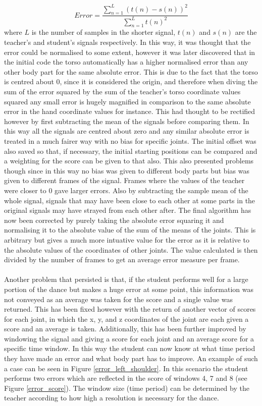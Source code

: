 \documentclass[a4paper]{article}
\begin{document}
\begin{equation}
Error = \dfrac{\sum\limits_{n=1}^{L}(t(n)-s(n))^2}{\sum\limits_{n=1}^{L}t(n)^2}
\end{equation}
where $L$ is the number of samples in the shorter signal, $t(n)$ and $s(n)$ are the teacher's and student's signals respectively. In this way, it was thought that the error could be normalised to some extent, however it was later discovered that in the initial code the torso automatically has a higher normalised error than any other body part for the same absolute error. This is due to the fact that the torso is centred about 0, since it is considered the origin, and therefore when diving the sum of the error squared by the sum of the teacher's torso coordinate values squared any small error is hugely magnified in comparison to the same absolute error in the hand coordinate values for instance. This had thought to be rectified however by first subtracting the mean of the signals before comparing them. In this way all the signals are centred about zero and any similar absolute error is treated in a much fairer way with no bias for specific joints. The initial offset was also saved so that, if necessary, the initial starting positions can be compared and a weighting for the score can be given to that also. This also presented problems though since in this way no bias was given to different body parts but bias was given to different frames of the signal. Frames where the values of the teacher were closer to 0 gave larger errors. Also by subtracting the sample mean of the whole signal, signals that may have been close to each other at some parts in the original signals may have strayed from each other after. The final algorithm has now been corrected by purely taking the absolute error squaring it and normalising it to the absolute value of the sum of the means of the joints. This is arbitrary but gives a much more intuative value for the error as it is relative to the absolute values of the coordinates of other joints. The value calculated is then divided by the number of frames to get an average error measure per frame.    
\\\\
\noindent
Another problem that persisted is that, if the student performs well for a large portion of the dance but makes a huge error at some point, this information was not conveyed as an average was taken for the score and a single value was returned. This has been fixed however with the return of another vector of scores for each joint, in which the x, y, and z coordinates of the joint are each given a score and an average is taken. Additionally, this has been further improved by windowing the signal and giving a score for each joint and an average score for a specific time window. In this way the student can now know at what time period they have made an error and what body part has to improve. An example of such a case can be seen in Figure \ref{error_left_shoulder}. In this scenario the student performs two errors which are reflected in the score of windows 4, 7 and 8 (see Figure \ref{error_score}). The window size (time period) can be determined by the teacher according to how high a resolution is necessary for the dance.
\end{document}
